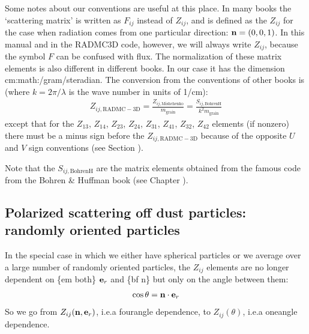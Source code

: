 \documentclass[letterpaper,10pt,english]{sphinxmanual}
\begin{document}
Some notes about our conventions are useful at this place. In many books the
‘scattering matrix’ is written as \(F_{ij}\) instead of \(Z_{ij}\), and is
defined as the \(Z_{ij}\) for the case when radiation comes from one
particular direction: \({\bf n}=(0,0,1)\). In this manual and in the RADMC\sphinxhyphen{}3D
code, however, we will always write \(Z_{ij}\), because the symbol \(F\) can be
confused with flux. The normalization of these matrix elements is also
different in different books. In our case it has the dimension
cm:math:/gram/steradian. The conversion from the conventions of other books is
(where \(k=2\pi/\lambda\) is the wave number in units of 1/cm):
\begin{equation*}
\begin{split}Z_{ij,\mathrm{RADMC-3D}} = \frac{Z_{ij,\mathrm{Mishchenko}}}{m_{\mathrm{grain}}}
= \frac{S_{ij,\mathrm{BohrenH}}}{k^2m_{\mathrm{grain}}}\end{split}
\end{equation*}
except that for the \(Z_{13}\), \(Z_{14}\), \(Z_{23}\),
\(Z_{24}\), \(Z_{31}\), \(Z_{41}\), \(Z_{32}\), \(Z_{42}\)
elements (if non\sphinxhyphen{}zero) there must be a minus sign before the
\(Z_{ij,\mathrm{RADMC-3D}}\) because of the opposite \(U\) and \(V\)
sign conventions (see Section {\hyperref[\detokenize{dustradtrans:sec-stokes-convent-differences}]{}}).

Note that the \(S_{ij,\mathrm{BohrenH}}\) are the matrix elements obtained
from the famous  code from the Bohren \& Huffman book
(see Chapter {\hyperref[\detokenize{opacitieswww:chap-acquiring-opacities}]{}}).


\subsection{Polarized scattering off dust particles: randomly oriented particles}
\label{\detokenize{dustradtrans:polarized-scattering-off-dust-particles-randomly-oriented-particles}}
In the special case in which we either have spherical particles or we
average over a large number of randomly oriented particles, the \(Z_{ij}\)
elements are no longer dependent on \{em both\} \({\bf e}_r\) and \{bf n\} but
only on the angle between them:
\begin{equation*}
\begin{split}\cos\theta = {\bf n}\cdot{\bf e}_r\end{split}
\end{equation*}
So we go from \(Z_{ij}({\bf n},{\bf e}_r)\), i.e.a four\sphinxhyphen{}angle dependence, to
\(Z_{ij}(\theta)\), i.e.a one\sphinxhyphen{}angle dependence.
\end{document}
